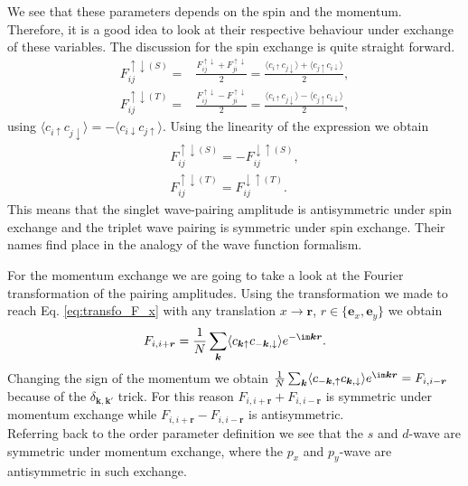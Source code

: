 \documentclass[../main.tex]{subfile}
\begin{document}
We see that these parameters depends on the spin and the momentum. Therefore, it is a good idea to look at their respective
behaviour under exchange of these variables.
The discussion for the spin exchange is quite straight forward.
\begin{align*}
    F_{ij}^{\uparrow\downarrow(S)} =& \frac{F_{ij}^{\uparrow\downarrow} + F_{ji}^{\uparrow\downarrow}}{2} = \frac{\langle c_{i\uparrow}c_{j\downarrow}\rangle + \langle c_{j\uparrow}c_{i\downarrow}\rangle}{2},\\
    F_{ij}^{\uparrow\downarrow(T)} =& \frac{F_{ij}^{\uparrow\downarrow} - F_{ji}^{\uparrow\downarrow}}{2} = \frac{\langle c_{i\uparrow}c_{j\downarrow}\rangle - \langle c_{j\uparrow}c_{i\downarrow}\rangle}{2},
\end{align*}
using $\langle c_{i\uparrow}c_{j\downarrow}\rangle = -\langle c_{i\downarrow}c_{j\uparrow}\rangle$. Using the linearity of the expression we obtain
\begin{align*}
    F_{ij}^{\uparrow\downarrow(S)} = - F_{ij}^{\downarrow\uparrow(S)},\\
    F_{ij}^{\uparrow\downarrow(T)} = F_{ij}^{\downarrow\uparrow(T)}.
\end{align*}
This means that the singlet wave-pairing amplitude is antisymmetric under spin exchange and the triplet wave pairing is symmetric under spin exchange. Their names
find place in the analogy of the wave function formalism.

For the momentum exchange we are going to take a look at the Fourier transformation of the pairing amplitudes. Using the transformation we made to 
reach Eq. \ref{eq:transfo_F_x} with any translation $ x \rightarrow \bm{r}$, $r\in \{\bm{e}_x,\bm{e}_y\}$ we obtain
\begin{align*}
    F_{i,i+ \bm{r}} = \frac{1}{N} \sum_{\bm{k}} \langle c_{\bm{k}\uparrow} c_{-\bm{k},\downarrow}\rangle e^{-\im\bm{k}\bm{r}}.
\end{align*}
Changing the sign of the momentum we obtain  $\frac{1}{N} \sum_{\bm{k}} \langle c_{-\bm{k},\uparrow} c_{\bm{k},\downarrow}\rangle e^{\im\bm{k}\bm{r}} =  F_{i,i- \bm{r}}$
because of the $\delta_{\bm{k},\bm{k}'}$ trick. For this reason $F_{i,i+ \bm{r}} +  F_{i,i- \bm{r}}$ is symmetric under momentum exchange while $F_{i,i+ \bm{r}} -  F_{i,i- \bm{r}}$ is antisymmetric.\\
Referring back to the order parameter definition we see that the $s$ and $d$-wave are symmetric under momentum exchange, where the $p_x$ and $p_y$-wave are antisymmetric in such exchange.\\
\end{document}
